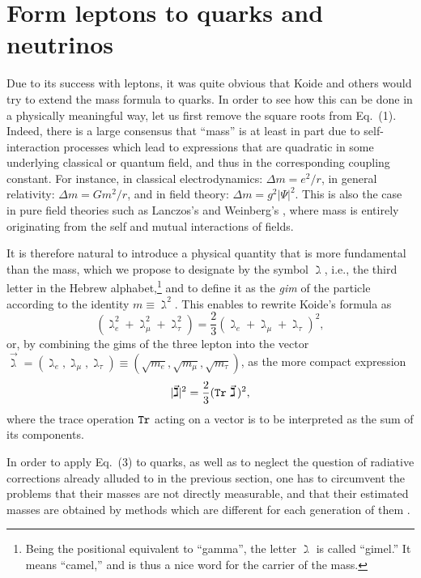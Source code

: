 \documentclass[12pt,a4paper]{article}
\begin{document}
\section*{Form leptons to quarks and neutrinos}

Due to its success with leptons, it was quite obvious that Koide and others would try to extend the mass formula to quarks.  In order to see how this can be done in a physically meaningful way, let us first remove the square roots from Eq.~(1).  Indeed, there is a large consensus that ``mass'' is at least in part due to self-interaction processes which lead to expressions that are quadratic in some underlying classical or quantum field, and thus in the corresponding coupling constant.  For instance, in classical electrodynamics:  $\Delta m = {e^2}/{r}$, in general relativity: $\Delta m = G {m^2}/{r}$, and in field theory:  $\Delta m = g^2 |\Psi|^2$.  This is also the case in pure field theories such as Lanczos's \cite{gh2005} and Weinberg's \cite{weinb}, where mass is entirely originating from the self and mutual interactions of fields. 

   It is therefore natural to introduce a physical quantity that is more fundamental than the mass, which we propose to designate by the symbol $\gimel$, i.e., the third letter in the Hebrew alphabet,\footnote{Being the positional equivalent to ``gamma'', the letter $\gimel$ is called ``gimel.'' It means  ``camel,'' and is thus a nice word for the carrier of the mass.} and to define it as the \emph{gim} of the particle according to the identity $m \equiv \gimel^2$.  This enables to rewrite Koide's formula as
%
\begin{equation} 
(\gimel_e^2+\gimel_\mu^2+\gimel_\tau^2) = \frac 23 ({\gimel_e}+{\gimel_\mu}+{\gimel_\tau})^2,
\end{equation}
%
or, by combining the gims of the three lepton into the vector $\vec\gimel = (\gimel_e,\gimel_\mu,\gimel_\tau) \equiv (\sqrt{m_e},\sqrt{m_\mu},\sqrt{m_\tau})$, as the more compact expression
%
\begin{equation} 
|\vec{\gimel}|^2 = \frac 23 ({\tt Tr~}\vec{\gimel}\,)^2,
\end{equation}
%
where the trace operation ${\tt Tr}$ acting on a vector is to be interpreted as the sum of its components.  

   In order to apply Eq.~(3) to quarks, as well as to neglect the question of radiative corrections already alluded to in the previous section, one has to circumvent the problems that their masses are not directly measurable, and that their estimated masses are obtained by methods which are different for each generation of them \cite{pdb2004}.
\end{document}

